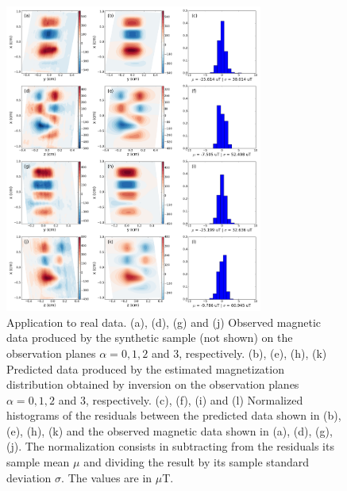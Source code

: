 \documentclass[galley,gc]{agutex}
\begin{document}
 \begin{figure}
 \noindent \includegraphics[width=20pc]{Figs/Fig14_LQ.png}
 \caption{Application to real data. (a), (d), (g) and (j) Observed
 magnetic data produced by the synthetic sample (not shown) on the
 observation planes $\alpha = 0, 1, 2$ and $3$, respectively.
 (b), (e), (h), (k) Predicted data produced by the estimated
 magnetization distribution obtained by inversion on the
 observation planes $\alpha = 0, 1, 2$ and $3$, respectively.
 (c), (f), (i) and (l) Normalized histograms of the residuals between the
 predicted data shown in (b), (e), (h), (k) and the 
 observed magnetic data shown in (a), (d), (g), (j). 
 The normalization
 consists in subtracting from the residuals its sample mean $\mu$ 
 and dividing the result by its sample standard deviation $\sigma$.
 The values are in $\mu$T.}
 \label{fig:datafit-real}
 \end{figure}
 
\end{document}
